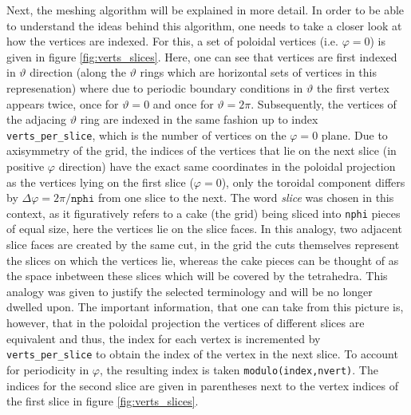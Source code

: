\documentclass[./main.tex]{subfiles}
\begin{document}
Next, the meshing algorithm will be explained in more detail. In order to be able to understand the ideas behind this algorithm, one needs to take a closer look at how the vertices are indexed. For this, a set of poloidal vertices (i.e. $\varphi=0$) is given in figure \ref{fig:verts_slices}. Here, one can see that vertices are first indexed in $\vartheta$ direction (along the $\vartheta$ rings which are horizontal sets of vertices in this represenation) where due to periodic boundary conditions in $\vartheta$ the first vertex appears twice, once for $\vartheta = 0$ and once for $\vartheta = 2\pi$. Subsequently, the vertices of the adjacing $\vartheta$ ring are indexed in the same fashion up to index \texttt{verts\_per\_slice}, which is the number of vertices on the $\varphi=0$ plane. Due to axisymmetry of the grid, the indices of the vertices that lie on the next slice (in positive $\varphi$ direction) have the exact same coordinates in the poloidal projection as the vertices lying on the first slice ($\varphi=0$), only the toroidal component differs by $\Delta\varphi = 2\pi/\texttt{nphi}$ from one slice to the next. The word \textit{slice} was chosen in this context, as it figuratively refers to a cake (the grid) being sliced into \texttt{nphi} pieces of equal size, here the vertices lie on the slice faces. In this analogy, two adjacent slice faces are created by the same cut, in the grid the cuts themselves represent the slices on which the vertices lie, whereas the cake pieces can be thought of as the space inbetween these slices which will be covered by the tetrahedra. This analogy was given to justify the selected terminology and will be no longer dwelled upon. The important information, that one can take from this picture is, however, that in the poloidal projection the vertices of different slices are equivalent and thus, the index for each vertex is incremented by \texttt{verts\_per\_slice} to obtain the index of the vertex in the next slice. To account for periodicity in $\varphi$, the resulting index is taken \texttt{modulo(index,nvert)}. The indices for the second slice are given in parentheses next to the vertex indices of the first slice in figure \ref{fig:verts_slices}.
\end{document}
